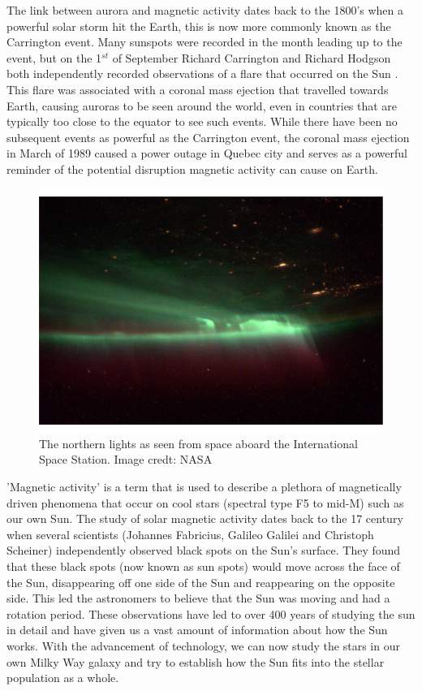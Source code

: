 The link between aurora and magnetic activity dates back to the 1800's when a powerful solar storm hit the Earth, this is now more commonly known as the Carrington event. Many sunspots were recorded in the month leading up to the event, but on the 1$^{st}$ of September Richard Carrington and Richard Hodgson both independently recorded observations of a flare that occurred on the Sun \citep{Carrington_1858,Hodgson_1859}. This flare was associated with a coronal mass ejection that travelled towards Earth, causing auroras to be seen around the world, even in countries that are typically too close to the equator to see such events. While there have been no subsequent events as powerful as the Carrington event, the coronal mass ejection in March of 1989 caused a power outage in Quebec city and serves as a powerful reminder of the potential disruption magnetic activity can cause on Earth. 

\begin{figure}
    \centering
    \includegraphics[scale=0.4]{Figures/1-Introduction/northern_lights_iss_20131009.pdf}
    \caption[Image of the northern lights as seen from space]{The northern lights as seen from space aboard the International Space Station. Image credt: NASA}
    \label{fig:aurora_from_space}
\end{figure}

'Magnetic activity' is a term that is used to describe a plethora of magnetically driven phenomena that occur on cool stars (spectral type F5 to mid-M) such as our own Sun. The study of solar magnetic activity dates back to the 17 century when several scientists (Johannes Fabricius, Galileo Galilei and Christoph Scheiner) independently observed black spots on the Sun's surface. They found that these black spots (now known as sun spots) would move across the face of the Sun, disappearing off one side of the Sun and reappearing on the opposite side. This led the astronomers to believe that the Sun was moving and had a rotation period. These observations have led to over 400 years of studying the sun in detail and have given us a vast amount of information about how the Sun works. With the advancement of technology, we can now study the stars in our own Milky Way galaxy and try to establish how the Sun fits into the stellar population as a whole.

